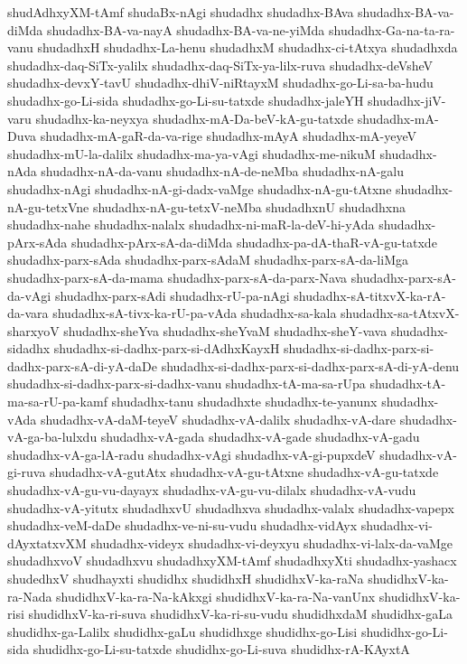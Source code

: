 {shudAdhxyXM-tAmf
shudaBx-nAgi
shudadhx
shudadhx-BAva
shudadhx-BA-va-diMda
shudadhx-BA-va-nayA
shudadhx-BA-va-ne-yiMda
shudadhx-Ga-na-ta-ra-vanu
shudadhxH
shudadhx-La-henu
shudadhxM
shudadhx-ci-tAtxya
shudadhxda
shudadhx-daq-SiTx-yalilx
shudadhx-daq-SiTx-ya-lilx-ruva
shudadhx-deVsheV
shudadhx-devxY-tavU
shudadhx-dhiV-niRtayxM
shudadhx-go-Li-sa-ba-hudu
shudadhx-go-Li-sida
shudadhx-go-Li-su-tatxde
shudadhx-jaleYH
shudadhx-jiV-varu
shudadhx-ka-neyxya
shudadhx-mA-Da-beV-kA-gu-tatxde
shudadhx-mA-Duva
shudadhx-mA-gaR-da-va-rige
shudadhx-mAyA
shudadhx-mA-yeyeV
shudadhx-mU-la-dalilx
shudadhx-ma-ya-vAgi
shudadhx-me-nikuM
shudadhx-nAda
shudadhx-nA-da-vanu
shudadhx-nA-de-neMba
shudadhx-nA-galu
shudadhx-nAgi
shudadhx-nA-gi-dadx-vaMge
shudadhx-nA-gu-tAtxne
shudadhx-nA-gu-tetxVne
shudadhx-nA-gu-tetxV-neMba
shudadhxnU
shudadhxna
shudadhx-nahe
shudadhx-nalalx
shudadhx-ni-maR-la-deV-hi-yAda
shudadhx-pArx-sAda
shudadhx-pArx-sA-da-diMda
shudadhx-pa-dA-thaR-vA-gu-tatxde
shudadhx-parx-sAda
shudadhx-parx-sAdaM
shudadhx-parx-sA-da-liMga
shudadhx-parx-sA-da-mama
shudadhx-parx-sA-da-parx-Nava
shudadhx-parx-sA-da-vAgi
shudadhx-parx-sAdi
shudadhx-rU-pa-nAgi
shudadhx-sA-titxvX-ka-rA-da-vara
shudadhx-sA-tivx-ka-rU-pa-vAda
shudadhx-sa-kala
shudadhx-sa-tAtxvX-sharxyoV
shudadhx-sheYva
shudadhx-sheYvaM
shudadhx-sheY-vava
shudadhx-sidadhx
shudadhx-si-dadhx-parx-si-dAdhxKayxH
shudadhx-si-dadhx-parx-si-dadhx-parx-sA-di-yA-daDe
shudadhx-si-dadhx-parx-si-dadhx-parx-sA-di-yA-denu
shudadhx-si-dadhx-parx-si-dadhx-vanu
shudadhx-tA-ma-sa-rUpa
shudadhx-tA-ma-sa-rU-pa-kamf
shudadhx-tanu
shudadhxte
shudadhx-te-yanunx
shudadhx-vAda
shudadhx-vA-daM-teyeV
shudadhx-vA-dalilx
shudadhx-vA-dare
shudadhx-vA-ga-ba-lulxdu
shudadhx-vA-gada
shudadhx-vA-gade
shudadhx-vA-gadu
shudadhx-vA-ga-lA-radu
shudadhx-vAgi
shudadhx-vA-gi-pupxdeV
shudadhx-vA-gi-ruva
shudadhx-vA-gutAtx
shudadhx-vA-gu-tAtxne
shudadhx-vA-gu-tatxde
shudadhx-vA-gu-vu-dayayx
shudadhx-vA-gu-vu-dilalx
shudadhx-vA-vudu
shudadhx-vA-yitutx
shudadhxvU
shudadhxva
shudadhx-valalx
shudadhx-vapepx
shudadhx-veM-daDe
shudadhx-ve-ni-su-vudu
shudadhx-vidAyx
shudadhx-vi-dAyxtatxvXM
shudadhx-videyx
shudadhx-vi-deyxyu
shudadhx-vi-lalx-da-vaMge
shudadhxvoV
shudadhxvu
shudadhxyXM-tAmf
shudadhxyXti
shudadhx-yashacx
shudedhxV
shudhayxti
shudidhx
shudidhxH
shudidhxV-ka-raNa
shudidhxV-ka-ra-Nada
shudidhxV-ka-ra-Na-kAkxgi
shudidhxV-ka-ra-Na-vanUnx
shudidhxV-ka-risi
shudidhxV-ka-ri-suva
shudidhxV-ka-ri-su-vudu
shudidhxdaM
shudidhx-gaLa
shudidhx-ga-Lalilx
shudidhx-gaLu
shudidhxge
shudidhx-go-Lisi
shudidhx-go-Li-sida
shudidhx-go-Li-su-tatxde
shudidhx-go-Li-suva
shudidhx-rA-KAyxtA
}
